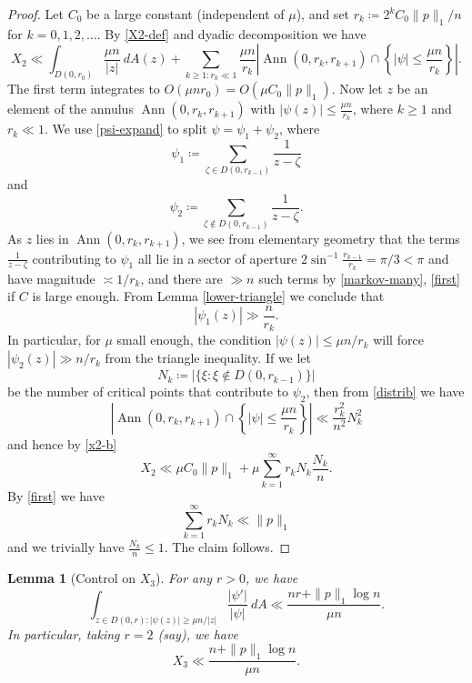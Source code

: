 \documentclass[12pt]{amsart}
\newtheorem{lemma}{Lemma}[section]
\newcommand{\Ann}{\operatorname{Ann}}
\begin{document}
\begin{proof}  Let $C_0$ be a large constant (independent of $\mu$), and set $r_k \coloneqq 2^k C_0 \|p\|_1/n$ for $k=0,1,2,\dots$.  By \eqref{X2-def} and dyadic decomposition we have
\begin{equation}\label{x2-b}
     X_2 \ll \int_{D(0,r_0)} \frac{\mu n}{|z|}\ dA(z)+ \sum_{k \geq 1: r_k \ll 1} \frac{\mu n}{r_k} \left|\Ann(0,r_k,r_{k+1}) \cap \left\{|\psi| \leq \frac{\mu n}{r_k}\right\}\right|.
\end{equation}
The first term integrates to $O(\mu n r_0) = O(\mu C_0 \|p\|_1)$.  Now let $z$ be an element of the annulus
$\Ann(0,r_k,r_{k+1})$ with $|\psi(z)| \leq \frac{\mu n}{r_k}$, where $k \geq 1$ and $r_k \ll 1$. We use \eqref{psi-expand} to split $\psi = \psi_1 + \psi_2$, where
$$ \psi_1 \coloneqq \sum_{\zeta \in D(0, r_{k-1})} \frac{1}{z-\zeta}$$
and
$$ \psi_2 \coloneqq \sum_{\zeta \notin D(0, r_{k-1})} \frac{1}{z-\zeta}.$$
As $z$ lies in $\Ann(0,r_k,r_{k+1})$, we see from elementary geometry that the terms $\frac{1}{z-\zeta}$ contributing to $\psi_1$ all lie in a sector of aperture $2 \sin^{-1} \frac{r_{k-1}}{r_k} = \pi/3 < \pi$ and have magnitude $\asymp 1/r_k$, and there are $\gg n$ such terms by \eqref{markov-many}, \eqref{first} if $C$ is large enough.  From Lemma \ref{lower-triangle} we conclude that
$$ |\psi_1(z)| \gg \frac{n}{r_k}.$$
In particular, for $\mu$ small enough, the condition $|\psi(z)| \leq \mu n / r_k$ will force $|\psi_2(z)| \gg n/r_k$ from the triangle inequality.  If we let
$$ N_k \coloneqq | \{ \xi: \xi \notin D(0,r_{k-1}) \} |$$
be the number of critical points that contribute to $\psi_2$, then
from \eqref{distrib} we have
$$ \left|\Ann(0,r_k,r_{k+1}) \cap \left\{|\psi| \leq \frac{\mu n}{r_k}\right\}\right| \ll \frac{r_k^2}{n^2} N_k^2$$
and hence by \eqref{x2-b}
$$ X_2 \ll \mu C_0 \|p\|_1 + \mu \sum_{k=1}^\infty r_k N_k \frac{N_k}{n}.$$
By \eqref{first} we have
\begin{equation}\label{nksum}
    \sum_{k=1}^\infty r_k N_k \ll \|p\|_1
\end{equation}
and we trivially have $\frac{N_k}{n} \leq 1$.  The claim follows.
\end{proof}

\begin{lemma}[Control on $X_3$]\label{x3-lem}
    For any $r>0$, we have
$$ \int_{z \in D(0,r): |\psi(z)| \geq \mu n / |z|} \frac{|\psi'|}{|\psi|}\ dA
 \ll \frac{nr+\|p\|_1 \log n}{\mu n} .$$
In particular, taking $r=2$ (say), we have
$$ X_3 \ll \frac{n+\|p\|_1 \log n}{\mu n}.$$
\end{lemma}
\end{document}

